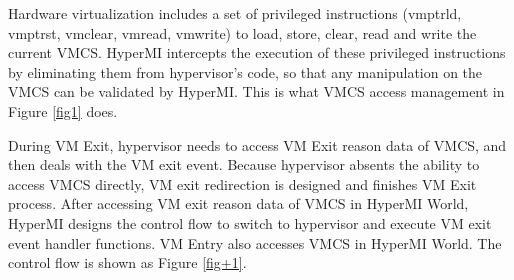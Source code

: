 \documentclass[conference]{IEEEtran}
\begin{document}
Hardware virtualization includes a set of privileged instructions (vmptrld, vmptrst, vmclear, vmread, vmwrite) to load, store, clear, read and write the current VMCS. HyperMI intercepts the execution of these
privileged instructions by eliminating them from hypervisor's code, so that any manipulation on the VMCS can be validated by HyperMI. This is what VMCS access management in Figure \ref{fig1} does.

 During VM Exit, hypervisor needs to access VM Exit reason data of VMCS, and then deals with the VM exit event.
Because hypervisor absents the ability to access VMCS directly, VM exit redirection is designed and finishes  VM Exit process. After accessing VM exit reason data of VMCS in HyperMI World,  HyperMI designs the control flow to switch to hypervisor and execute VM exit event handler functions. VM Entry also accesses VMCS in HyperMI World. The control flow is shown as Figure \ref{fig+1}.
\end{document}
